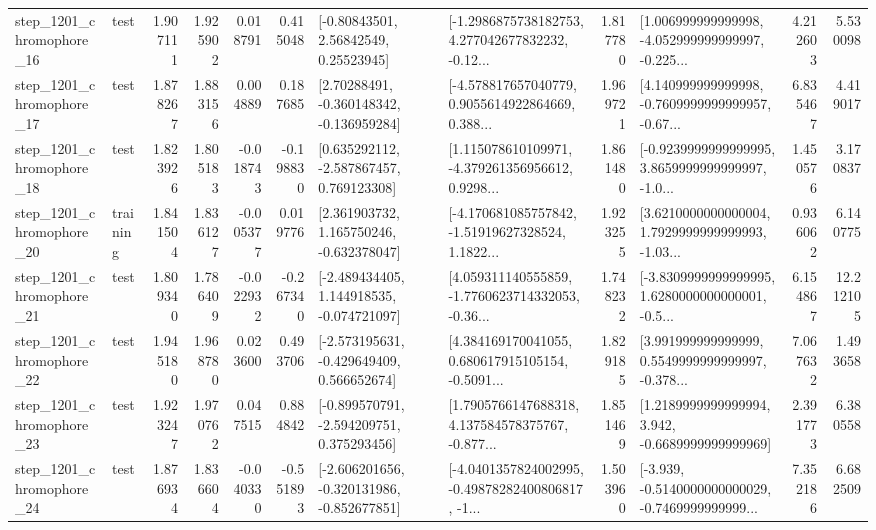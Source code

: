 \begin{tabular}{llrrrrllrlrr}
 step\_1201\_chromophore\_16 &      test &      1.907111 &    1.925902 &      0.018791 &  0.415048 &       [-0.80843501, 2.56842549, 0.25523945] &  [-1.2986875738182753, 4.277042677832232, -0.12... &       1.817780 &  [1.006999999999998, -4.052999999999997, -0.225... &            4.212603 &          5.530098 \\
 step\_1201\_chromophore\_17 &      test &      1.878267 &    1.883156 &      0.004889 &  0.187685 &    [2.70288491, -0.360148342, -0.136959284] &  [-4.578817657040779, 0.9055614922864669, 0.388... &       1.969721 &  [4.140999999999998, -0.7609999999999957, -0.67... &            6.835467 &          4.419017 \\
 step\_1201\_chromophore\_18 &      test &      1.823926 &    1.805183 &     -0.018743 & -0.198830 &    [0.635292112, -2.587867457, 0.769123308] &  [1.115078610109971, -4.379261356956612, 0.9298... &       1.861480 &  [-0.9239999999999995, 3.8659999999999997, -1.0... &            1.450576 &          3.170837 \\
 step\_1201\_chromophore\_20 &  training &      1.841504 &    1.836127 &     -0.005377 &  0.019776 &    [2.361903732, 1.165750246, -0.632378047] &  [-4.170681085757842, -1.51919627328524, 1.1822... &       1.923255 &  [3.6210000000000004, 1.7929999999999993, -1.03... &            0.936062 &          6.140775 \\
 step\_1201\_chromophore\_21 &      test &      1.809340 &    1.786409 &     -0.022932 & -0.267340 &   [-2.489434405, 1.144918535, -0.074721097] &  [4.059311140555859, -1.7760623714332053, -0.36... &       1.748232 &  [-3.8309999999999995, 1.6280000000000001, -0.5... &            6.154867 &         12.212105 \\
 step\_1201\_chromophore\_22 &      test &      1.945180 &    1.968780 &      0.023600 &  0.493706 &   [-2.573195631, -0.429649409, 0.566652674] &  [4.384169170041055, 0.680617915105154, -0.5091... &       1.829185 &  [3.991999999999999, 0.5549999999999997, -0.378... &            7.067632 &          1.493658 \\
 step\_1201\_chromophore\_23 &      test &      1.923247 &    1.970762 &      0.047515 &  0.884842 &   [-0.899570791, -2.594209751, 0.375293456] &  [1.7905766147688318, 4.137584578375767, -0.877... &       1.851469 &   [1.2189999999999994, 3.942, -0.6689999999999969] &            2.391773 &          6.380558 \\
 step\_1201\_chromophore\_24 &      test &      1.876934 &    1.836604 &     -0.040330 & -0.551893 &  [-2.606201656, -0.320131986, -0.852677851] &  [-4.0401357824002995, -0.49878282400806817, -1... &       1.503960 &  [-3.939, -0.5140000000000029, -0.7469999999999... &            7.352186 &          6.682509 \\

\end{tabular}
